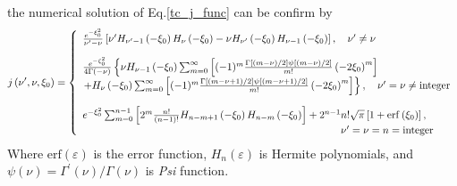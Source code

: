   the numerical solution of Eq.\eqref{tc_j_func} can be confirm by
  \begin{equation}
    j\left(\nu^{\prime}, \nu, \xi_{0}\right)=\left\{
      \begin{array}{l}
        \frac{e^{-\xi_{0}^{2}}}{\nu^{\prime}-\nu}\left[\nu^{\prime} H_{\nu^{\prime}-1}\left(-\xi_{0}\right) H_{\nu}\left(-\xi_{0}\right)-\nu H_{\nu^{\prime}}\left(-\xi_{0}\right) H_{\nu-1}\left(-\xi_{0}\right)\right], \quad \nu^{\prime} \neq \nu \vspace{2.5ex} \\
        \frac{e^{-\xi_{0}^{2}}}{4 \Gamma(-\nu)}\left\{\nu H_{\nu-1}\left(-\xi_{0}\right) \sum_{m=0}^{\infty}\left[(-1)^{m} \frac{\Gamma[(m-\nu) / 2] \psi[(m-\nu) / 2]}{m !}\left(-2 \xi_{0}\right)^{m}\right]\right. \\
        \left.+H_{\nu}\left(-\xi_{0}\right) \sum_{m=0}^{\infty}\left[(-1)^{m} \frac{\Gamma[(m-\nu+1) / 2] \psi[(m-\nu+1) / 2]}{m !}\left(-2 \xi_{0}\right)^{m}\right]\right\}, \quad \nu^{\prime}=\nu \neq \text {integer} \vspace{2.5ex} \\
        e^{-\xi_{0}^{2}} \sum_{m=0}^{n-1}\left[2^{m} \frac{n !}{(n-1) !} H_{n-m+1}\left(-\xi_{0}\right) H_{n-m}\left(-\xi_{0}\right)\right]+2^{n-1} n ! \sqrt{\pi}\left[1+\operatorname{erf}\left(\xi_{0}\right)\right], \\
        \quad \quad \quad \quad \quad \quad \quad \quad \quad \quad \quad \quad \quad \quad \quad \quad \quad \quad \quad \quad \quad \quad \quad \quad \quad \nu^{\prime}=\nu=n=\text{integer}
      \end{array}\right.
  \end{equation}
  Where $\text{erf}(\varepsilon)$ is the error function, $H_n(\varepsilon)$ is Hermite polynomials, and $\psi(\nu) = \Gamma^\prime(\nu) / \Gamma(\nu)$ is \textit{Psi} function.


